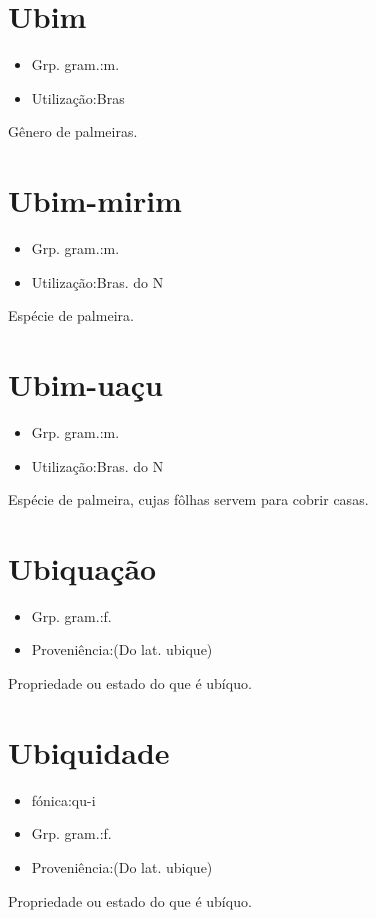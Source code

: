\documentclass{article}
\begin{document}
\section{Ubim}
\begin{itemize}
\item {Grp. gram.:m.}
\end{itemize}
\begin{itemize}
\item {Utilização:Bras}
\end{itemize}
Gênero de palmeiras.
\section{Ubim-mirim}
\begin{itemize}
\item {Grp. gram.:m.}
\end{itemize}
\begin{itemize}
\item {Utilização:Bras. do N}
\end{itemize}
Espécie de palmeira.
\section{Ubim-uaçu}
\begin{itemize}
\item {Grp. gram.:m.}
\end{itemize}
\begin{itemize}
\item {Utilização:Bras. do N}
\end{itemize}
Espécie de palmeira, cujas fôlhas servem para cobrir casas.
\section{Ubiquação}
\begin{itemize}
\item {Grp. gram.:f.}
\end{itemize}
\begin{itemize}
\item {Proveniência:(Do lat. \textunderscore ubique\textunderscore )}
\end{itemize}
Propriedade ou estado do que é ubíquo.
\section{Ubiquidade}
\begin{itemize}
\item {fónica:qu-i}
\end{itemize}
\begin{itemize}
\item {Grp. gram.:f.}
\end{itemize}
\begin{itemize}
\item {Proveniência:(Do lat. \textunderscore ubique\textunderscore )}
\end{itemize}
Propriedade ou estado do que é ubíquo.
\end{document}
